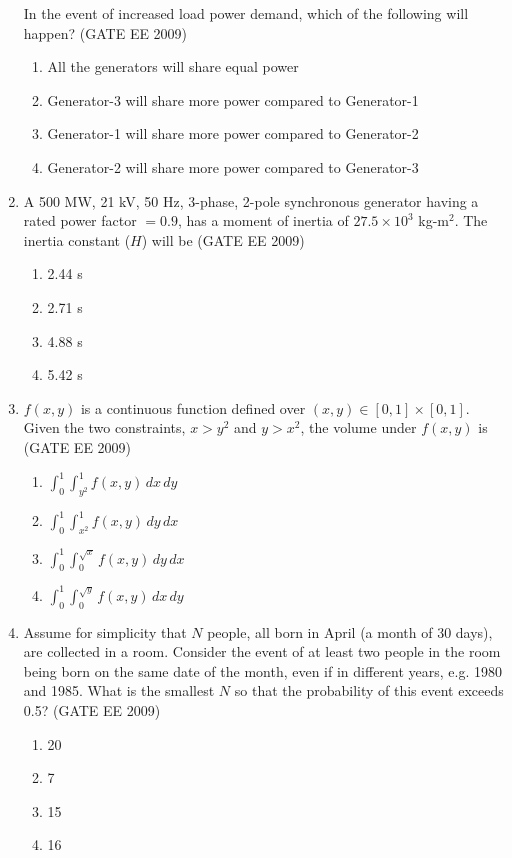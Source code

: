 \documentclass[journal,12pt,onecolumn]{IEEEtran}
\theoremstyle{remark}
\begin{document}
\begin{flushleft}
\begin{enumerate}
In the event of increased load power demand, which of the following will happen?
\hfill(GATE EE 2009)
\begin{enumerate}
    \item All the generators will share equal power
    \item Generator-3 will share more power compared to Generator-1
    \item Generator-1 will share more power compared to Generator-2
    \item Generator-2 will share more power compared to Generator-3
\end{enumerate}



\item A 500 MW, 21 kV, 50 Hz, 3-phase, 2-pole synchronous generator having a rated power factor $= 0.9$, has a moment of inertia of $27.5 \times 10^{3}$ kg-m$^{2}$. The inertia constant ($H$) will be
\hfill(GATE EE 2009)
\begin{enumerate}
    \item 2.44 s
    \item 2.71 s
    \item 4.88 s
    \item 5.42 s
\end{enumerate}


\item $f(x, y)$ is a continuous function defined over $(x,y) \in [0,1]\times[0,1]$. Given the two constraints, $x > y^{2}$ and $y > x^{2}$, the volume under $f(x,y)$ is
\hfill(GATE EE 2009)
\begin{enumerate}
    \item $\displaystyle \int_{0}^{1} \int_{y^{2}}^{1} f(x,y) \, dx \, dy$
    \item $\displaystyle \int_{0}^{1} \int_{x^{2}}^{1} f(x,y) \, dy \, dx$
    \item $\displaystyle \int_{0}^{1} \int_{0}^{\sqrt{x}} f(x,y) \, dy \, dx$
    \item $\displaystyle \int_{0}^{1} \int_{0}^{\sqrt{y}} f(x,y) \, dx \, dy$
\end{enumerate}


\item Assume for simplicity that $N$ people, all born in April (a month of 30 days), are collected in a room. Consider the event of at least two people in the room being born on the same date of the month, even if in different years, e.g. 1980 and 1985. What is the smallest $N$ so that the probability of this event exceeds 0.5?
\hfill(GATE EE 2009)
\begin{enumerate}
    \item 20
    \item 7
    \item 15
    \item 16
\end{enumerate}




\end{enumerate}
\end{flushleft}
\end{document}
